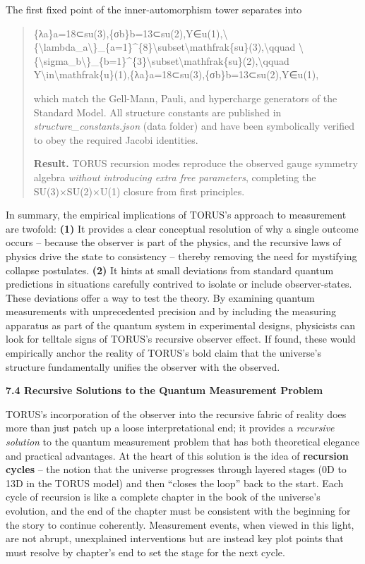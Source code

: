 \documentclass[]{article}
\begin{document}
The first fixed point of the inner-automorphism tower separates into

\begin{quote}
\{λa\}a=18⊂su(3),\{σb\}b=13⊂su(2),Y∈u(1),\textbackslash{}\{\textbackslash{}lambda\_a\textbackslash{}\}\_\{a=1\}\^{}\{8\}\textbackslash{}subset\textbackslash{}mathfrak\{su\}(3),\textbackslash{}qquad
\textbackslash{}\{\textbackslash{}sigma\_b\textbackslash{}\}\_\{b=1\}\^{}\{3\}\textbackslash{}subset\textbackslash{}mathfrak\{su\}(2),\textbackslash{}qquad
Y\textbackslash{}in\textbackslash{}mathfrak\{u\}(1),\{λa​\}a=18​⊂su(3),\{σb​\}b=13​⊂su(2),Y∈u(1),

which match the Gell-Mann, Pauli, and hypercharge generators of the
Standard Model. All structure constants are published in
\emph{structure\_constants.json} (data folder) and have been
symbolically verified to obey the required Jacobi identities.

\textbf{Result.} TORUS recursion modes reproduce the observed gauge
symmetry algebra \emph{without introducing extra free parameters},
completing the SU(3)×SU(2)×U(1) closure from first principles.
\end{quote}

In summary, the empirical implications of TORUS's approach to
measurement are twofold: \textbf{(1)} It provides a clear conceptual
resolution of why a single outcome occurs -- because the observer is
part of the physics, and the recursive laws of physics drive the state
to consistency -- thereby removing the need for mystifying collapse
postulates. \textbf{(2)} It hints at small deviations from standard
quantum predictions in situations carefully contrived to isolate or
include observer-states. These deviations offer a way to test the
theory. By examining quantum measurements with unprecedented precision
and by including the measuring apparatus as part of the quantum system
in experimental designs, physicists can look for telltale signs of
TORUS's recursive observer effect. If found, these would empirically
anchor the reality of TORUS's bold claim that the universe's structure
fundamentally unifies the observer with the observed.

\textbf{7.4 Recursive Solutions to the Quantum Measurement Problem}

TORUS's incorporation of the observer into the recursive fabric of
reality does more than just patch up a loose interpretational end; it
provides a \emph{recursive solution} to the quantum measurement problem
that has both theoretical elegance and practical advantages. At the
heart of this solution is the idea of \textbf{recursion cycles} -- the
notion that the universe progresses through layered stages (0D to 13D in
the TORUS model) and then ``closes the loop'' back to the start. Each
cycle of recursion is like a complete chapter in the book of the
universe's evolution, and the end of the chapter must be consistent with
the beginning for the story to continue coherently. Measurement events,
when viewed in this light, are not abrupt, unexplained interventions but
are instead key plot points that must resolve by chapter's end to set
the stage for the next cycle.
\end{document}
